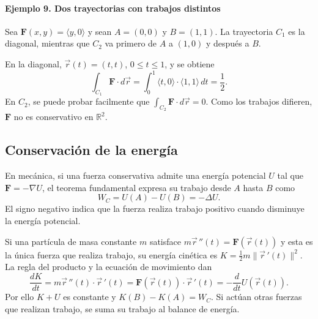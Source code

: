 \begin{samepage}
\paragraph{Ejemplo 9. Dos trayectorias con trabajos distintos}
Sea $\mathbf{F}(x,y)=\langle y,0\rangle$ y sean $A=(0,0)$ y $B=(1,1)$. La trayectoria $C_1$ es la diagonal, mientras que $C_2$ va primero de $A$ a $(1,0)$ y después a $B$.

\begingroup
\shorthandoff{>}
\begin{center}
\end{center}
\endgroup
\end{samepage}

En la diagonal, $\vec r(t)=(t,t)$, $0\leq t\leq1$, y se obtiene
\[
\int_{C_1}\mathbf{F}\cdot d\vec r
=\int_0^1\langle t,0\rangle\cdot\langle1,1\rangle\,dt=\frac12.
\]
En $C_2$, se puede probar facilmente que $\int_{C_2}\mathbf{F}\cdot d\vec r=0$. Como los trabajos difieren, $\mathbf{F}$ no es conservativo en $\mathbb R^2$.

\subsection{Conservación de la energía}

En mecánica, si una fuerza conservativa admite una energía potencial $U$ tal que $\mathbf{F}=-\nabla U$, el teorema fundamental expresa su trabajo desde $A$ hasta $B$ como
\[
W_C=U(A)-U(B)=-\Delta U.
\]
El signo negativo indica que la fuerza realiza trabajo positivo cuando disminuye la energía potencial.

Si una partícula de masa constante $m$ satisface $m\vec r\,''(t)=\mathbf{F}(\vec r(t))$ y esta es la única fuerza que realiza trabajo, su energía cinética es $K=\tfrac12m\|\vec r\,'(t)\|^2$. La regla del producto y la ecuación de movimiento dan
\[
\frac{dK}{dt}=m\vec r\,''(t)\cdot\vec r\,'(t)
=\mathbf{F}(\vec r(t))\cdot\vec r\,'(t)
=-\frac{d}{dt}U(\vec r(t)).
\]
Por ello $K+U$ es constante y $K(B)-K(A)=W_C$. Si actúan otras fuerzas que realizan trabajo, se suma su trabajo al balance de energía.

